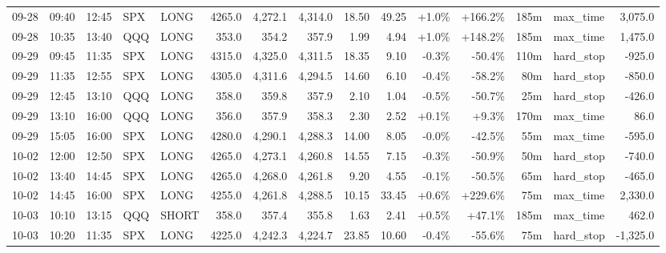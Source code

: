 \documentclass[11pt,a4paper,twoside]{article}
\begin{document}
\begin{landscape}
\begin{center}
\begin{longtable}{>{\color{txtmain}}l l l l l r r r r r r r r >{\color{txtmain}}l r}
09-28 & 09:40 & 12:45 & SPX & LONG & 4265.0 & 4,272.1 & 4,314.0 & 18.50 & 49.25 & \textcolor{wingreen}{+1.0\%} & \textcolor{wingreen}{+166.2\%} & 185m & max\_time & \textcolor{wingreen}{3,075.0} \\
09-28 & 10:35 & 13:40 & QQQ & LONG & 353.0 & 354.2 & 357.9 & 1.99 & 4.94 & \textcolor{wingreen}{+1.0\%} & \textcolor{wingreen}{+148.2\%} & 185m & max\_time & \textcolor{wingreen}{1,475.0} \\
09-29 & 09:45 & 11:35 & SPX & LONG & 4315.0 & 4,325.0 & 4,311.5 & 18.35 & 9.10 & \textcolor{lossred}{-0.3\%} & \textcolor{lossred}{-50.4\%} & 110m & hard\_stop & \textcolor{lossred}{-925.0} \\
09-29 & 11:35 & 12:55 & SPX & LONG & 4305.0 & 4,311.6 & 4,294.5 & 14.60 & 6.10 & \textcolor{lossred}{-0.4\%} & \textcolor{lossred}{-58.2\%} & 80m & hard\_stop & \textcolor{lossred}{-850.0} \\
09-29 & 12:45 & 13:10 & QQQ & LONG & 358.0 & 359.8 & 357.9 & 2.10 & 1.04 & \textcolor{lossred}{-0.5\%} & \textcolor{lossred}{-50.7\%} & 25m & hard\_stop & \textcolor{lossred}{-426.0} \\
09-29 & 13:10 & 16:00 & QQQ & LONG & 356.0 & 357.9 & 358.3 & 2.30 & 2.52 & \textcolor{wingreen}{+0.1\%} & \textcolor{wingreen}{+9.3\%} & 170m & max\_time & \textcolor{wingreen}{86.0} \\
09-29 & 15:05 & 16:00 & SPX & LONG & 4280.0 & 4,290.1 & 4,288.3 & 14.00 & 8.05 & \textcolor{lossred}{-0.0\%} & \textcolor{lossred}{-42.5\%} & 55m & max\_time & \textcolor{lossred}{-595.0} \\
10-02 & 12:00 & 12:50 & SPX & LONG & 4265.0 & 4,273.1 & 4,260.8 & 14.55 & 7.15 & \textcolor{lossred}{-0.3\%} & \textcolor{lossred}{-50.9\%} & 50m & hard\_stop & \textcolor{lossred}{-740.0} \\
10-02 & 13:40 & 14:45 & SPX & LONG & 4265.0 & 4,268.0 & 4,261.8 & 9.20 & 4.55 & \textcolor{lossred}{-0.1\%} & \textcolor{lossred}{-50.5\%} & 65m & hard\_stop & \textcolor{lossred}{-465.0} \\
10-02 & 14:45 & 16:00 & SPX & LONG & 4255.0 & 4,261.8 & 4,288.5 & 10.15 & 33.45 & \textcolor{wingreen}{+0.6\%} & \textcolor{wingreen}{+229.6\%} & 75m & max\_time & \textcolor{wingreen}{2,330.0} \\
10-03 & 10:10 & 13:15 & QQQ & SHORT & 358.0 & 357.4 & 355.8 & 1.63 & 2.41 & \textcolor{wingreen}{+0.5\%} & \textcolor{wingreen}{+47.1\%} & 185m & max\_time & \textcolor{wingreen}{462.0} \\
10-03 & 10:20 & 11:35 & SPX & LONG & 4225.0 & 4,242.3 & 4,224.7 & 23.85 & 10.60 & \textcolor{lossred}{-0.4\%} & \textcolor{lossred}{-55.6\%} & 75m & hard\_stop & \textcolor{lossred}{-1,325.0} \\

\end{longtable}
\end{center}
\end{landscape}
\end{document}
